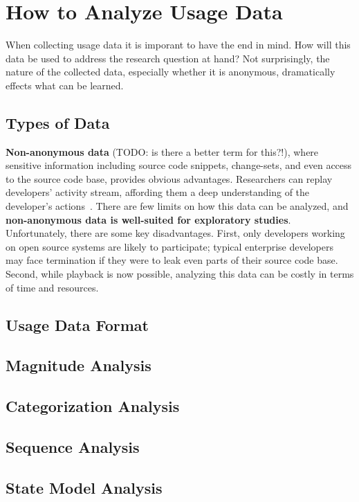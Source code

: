 
\section{How to Analyze Usage Data}

When collecting usage data it is imporant to have the end in mind. How will this data be used to address the research question at hand? Not surprisingly, the nature of the collected data, especially whether it is anonymous, dramatically effects what can be learned.


\subsection{Types of Data}

\noindent
{\bf Non-anonymous data} (TODO: is there a better term for this?!), where sensitive information including source code snippets, change-sets, and even access to the source code base, provides obvious advantages. Researchers can replay developers' activity stream, affording them a deep understanding of the developer's actions~\cite{UseDisuseMisuseRefactoringsExtendedVersion}. There are few limits on how this data can be analyzed, and {\bf non-anonymous data is well-suited for exploratory studies}. Unfortunately, there are some key disadvantages. First, only developers working on open source systems are likely to participate; typical enterprise developers may face termination if they were to leak even parts of their source code base. Second, while playback is now possible, analyzing this data can be costly in terms of time and resources. 



\subsection{Usage Data Format}


\subsection{Magnitude Analysis}


\subsection{Categorization Analysis}


\subsection{Sequence Analysis}



\subsection{State Model Analysis}

